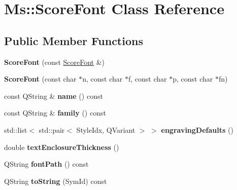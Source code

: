 \hypertarget{class_ms_1_1_score_font}{}\section{Ms\+:\+:Score\+Font Class Reference}
\label{class_ms_1_1_score_font}
\subsection*{Public Member Functions}
\begin{DoxyCompactItemize}
\item 
\mbox{\label{class_ms_1_1_score_font_a72cf9cdba9d6d3d8a3e56723510f26f3}} 
{\bfseries Score\+Font} (const \hyperlink{class_ms_1_1_score_font}{Score\+Font} \&)
\item 
\mbox{\label{class_ms_1_1_score_font_aae4a92e540ea78016100af5ebfc8772b}} 
{\bfseries Score\+Font} (const char $\ast$n, const char $\ast$f, const char $\ast$p, const char $\ast$fn)
\item 
\mbox{\label{class_ms_1_1_score_font_a503d4583237625b3e7979ba158d9b6c8}} 
const Q\+String \& {\bfseries name} () const
\item 
\mbox{\label{class_ms_1_1_score_font_a969f63878a8c26273adc6afc567abd6a}} 
const Q\+String \& {\bfseries family} () const
\item 
\mbox{\label{class_ms_1_1_score_font_ae2eaf8921f120bc747a6e65adda21027}} 
std\+::list$<$ std\+::pair$<$ Style\+Idx, Q\+Variant $>$ $>$ {\bfseries engraving\+Defaults} ()
\item 
\mbox{\label{class_ms_1_1_score_font_ae554ef277b237517b6ac9b063e6e6651}} 
double {\bfseries text\+Enclosure\+Thickness} ()
\item 
\mbox{\label{class_ms_1_1_score_font_a81a28f4442df540a189f30a2c23d0e25}} 
Q\+String {\bfseries font\+Path} () const
\item 
\mbox{\label{class_ms_1_1_score_font_a6116f9e06f30a9872b7badc3b2e1f7a8}} 
Q\+String {\bfseries to\+String} (Sym\+Id) const

\end{DoxyCompactItemize}
